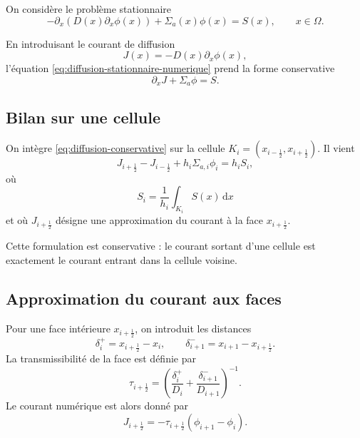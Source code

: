 \documentclass{article}
\begin{document}
On considère le problème stationnaire
\begin{equation}
    -\partial_x\!\left(D(x)\partial_x\phi(x)\right) +\Sigma_a(x)\phi(x)
    =S(x), \qquad x\in\Omega.
    \label{eq:diffusion-stationnaire-numerique}
\end{equation}

En introduisant le courant de diffusion
\begin{equation}
    J(x)=-D(x)\partial_x\phi(x),
    \label{eq:courant-diffusion}
\end{equation}
l'équation \eqref{eq:diffusion-stationnaire-numerique} prend la forme
conservative
\begin{equation}
    \partial_xJ+\Sigma_a\phi=S.
    \label{eq:diffusion-conservative}
\end{equation}

\subsection {Bilan sur une cellule}

On intègre \eqref{eq:diffusion-conservative} sur la cellule
$K_i=(x_{i-\frac12},x_{i+\frac12})$. Il vient
\begin{equation}
    J_{i+\frac12}-J_{i-\frac12} +h_i\Sigma_{a,i}\phi_i =h_iS_i,
    \label{eq:bilan-diffusion-cellule}
\end{equation}
où
\[
    S_i=\frac{1}{h_i}\int_{K_i}S(x)\,\mathrm{d}x
\]
et où $J_{i+\frac12}$ désigne une approximation du courant à la face $x_{i+\frac12}$.

Cette formulation est conservative : le courant sortant d'une cellule est exactement le courant entrant dans la cellule voisine.

\subsection {Approximation du courant aux faces}

Pour une face intérieure $x_{i+\frac12}$, on introduit les distances
\[
    \delta_i^+=x_{i+\frac12}-x_i,  \qquad   \delta_{i+1}^-=x_{i+1}-x_{i+\frac12}.
\]
La transmissibilité de la face est définie par
\begin{equation}
    \tau_{i+\frac12}
    =
    \left(
        \frac{\delta_i^+}{D_i}
        +
        \frac{\delta_{i+1}^-}{D_{i+1}}
    \right)^{-1}.
    \label{eq:transmissibilite}
\end{equation}
Le courant numérique est alors donné par
\begin{equation}
    J_{i+\frac12} = -\tau_{i+\frac12}  \left(\phi_{i+1}-\phi_i\right).
    \label{eq:courant-numerique}
\end{equation}
\end{document}
